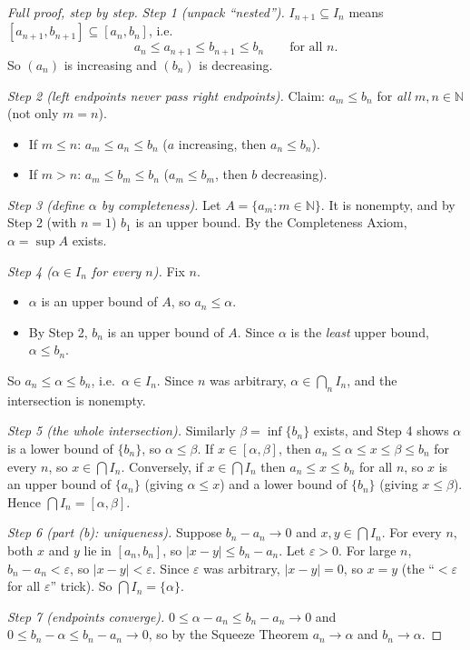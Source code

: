 \documentclass[11pt]{article}
\theoremstyle{definition}
\newcommand{\N}{\mathbb{N}}
\newcommand{\eps}{\varepsilon}
\begin{document}
\begin{proof}[Full proof, step by step]
\emph{Step 1 (unpack ``nested'').} $I_{n+1}\subseteq I_n$ means
$[a_{n+1},b_{n+1}]\subseteq[a_n,b_n]$, i.e.
\[
a_n\le a_{n+1}\le b_{n+1}\le b_n\qquad\text{for all }n.
\]
So $(a_n)$ is increasing and $(b_n)$ is decreasing.

\emph{Step 2 (left endpoints never pass right endpoints).} Claim:
$a_m\le b_n$ for \emph{all} $m,n\in\N$ (not only $m=n$).
\begin{itemize}[nosep]
  \item If $m\le n$: $a_m\le a_n\le b_n$ ($a$ increasing, then
        $a_n\le b_n$).
  \item If $m>n$: $a_m\le b_m\le b_n$ ($a_m\le b_m$, then $b$
        decreasing).
\end{itemize}

\emph{Step 3 (define $\alpha$ by completeness).} Let
$A=\{a_m:m\in\N\}$. It is nonempty, and by Step 2 (with $n=1$) $b_1$ is an
upper bound. By the Completeness Axiom, $\alpha=\sup A$ exists.

\emph{Step 4 ($\alpha\in I_n$ for every $n$).} Fix $n$.
\begin{itemize}[nosep]
  \item $\alpha$ is an upper bound of $A$, so $a_n\le\alpha$.
  \item By Step 2, $b_n$ is an upper bound of $A$. Since $\alpha$ is the
        \emph{least} upper bound, $\alpha\le b_n$.
\end{itemize}
So $a_n\le\alpha\le b_n$, i.e.\ $\alpha\in I_n$. Since $n$ was arbitrary,
$\alpha\in\bigcap_nI_n$, and the intersection is nonempty.

\emph{Step 5 (the whole intersection).} Similarly
$\beta=\inf\{b_n\}$ exists, and Step 4 shows $\alpha$ is a lower bound of
$\{b_n\}$, so $\alpha\le\beta$. If $x\in[\alpha,\beta]$, then
$a_n\le\alpha\le x\le\beta\le b_n$ for every $n$, so $x\in\bigcap I_n$.
Conversely, if $x\in\bigcap I_n$ then $a_n\le x\le b_n$ for all $n$, so
$x$ is an upper bound of $\{a_n\}$ (giving $\alpha\le x$) and a lower
bound of $\{b_n\}$ (giving $x\le\beta$). Hence $\bigcap I_n=[\alpha,\beta]$.

\emph{Step 6 (part (b): uniqueness).} Suppose $b_n-a_n\to0$ and
$x,y\in\bigcap I_n$. For every $n$, both $x$ and $y$ lie in
$[a_n,b_n]$, so $|x-y|\le b_n-a_n$. Let $\eps>0$. For large $n$,
$b_n-a_n<\eps$, so $|x-y|<\eps$. Since $\eps$ was arbitrary,
$|x-y|=0$, so $x=y$ (the ``$<\eps$ for all $\eps$'' trick). So
$\bigcap I_n=\{\alpha\}$.

\emph{Step 7 (endpoints converge).} $0\le\alpha-a_n\le b_n-a_n\to0$ and
$0\le b_n-\alpha\le b_n-a_n\to0$, so by the Squeeze Theorem
$a_n\to\alpha$ and $b_n\to\alpha$.
\end{proof}
\end{document}
